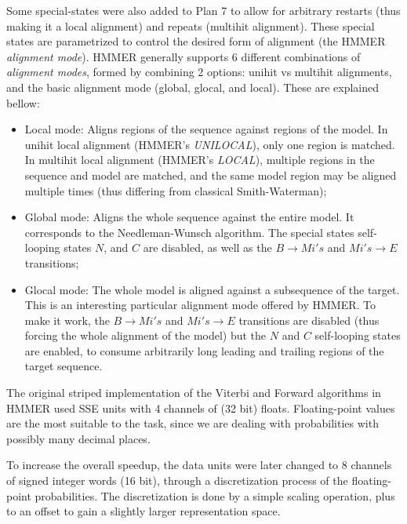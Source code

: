 Some special-states were also added to Plan 7 to allow for arbitrary restarts (thus making it a local alignment) and repeats (multihit alignment). These special states are parametrized to control the desired form of alignment (the HMMER \emph{alignment mode}). HMMER generally supports 6 different combinations of \emph{alignment modes}, formed by combining 2 options: unihit vs multihit alignments, and the basic alignment mode (global, glocal, and local). These are explained bellow: 

\begin{itemize}

\item Local mode: Aligns regions of the sequence against regions of the model. In unihit local alignment (HMMER's \emph{UNILOCAL}), only one region is matched. In multihit local alignment (HMMER's \emph{LOCAL}), multiple regions in the sequence and model are matched, and the same model region may be aligned multiple times (thus differing from classical Smith-Waterman);

\item Global mode: Aligns the whole sequence against the entire model. It corresponds to the Needleman-Wunsch algorithm. The special states self-looping states $N$, and $C$ are disabled, as well as the $B \rightarrow Mi's$ and $Mi's \rightarrow E$ transitions;

\item Glocal mode: The whole model is aligned against a subsequence of the target. This is an interesting particular alignment mode offered by HMMER. To make it work, the $B \rightarrow Mi's$ and $Mi's \rightarrow E$ transitions are disabled (thus forcing the whole alignment of the model) but the $N$ and $C$ self-looping states are enabled, to consume arbitrarily long  leading and trailing regions of the target sequence.

\end{itemize}

The original striped implementation of the Viterbi and Forward algorithms in HMMER used SSE units with 4 channels of (32 bit) floats. Floating-point values are the most suitable to the task, since we are dealing with probabilities with possibly many decimal places.

To increase the overall speedup, the data units were later changed to 8 channels of signed integer words (16 bit), through a discretization process of the floating-point probabilities. The discretization is done by a simple scaling operation, plus to an offset to gain a slightly larger representation space.

